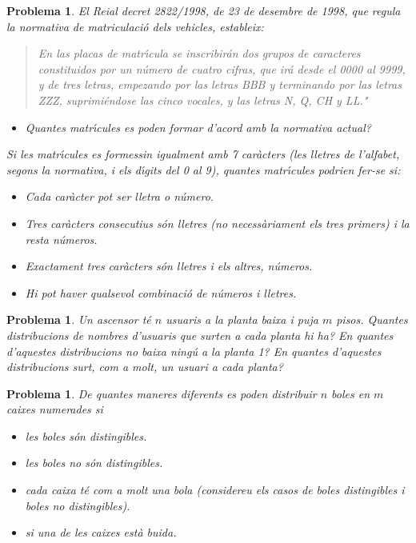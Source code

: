 \documentclass[11pt]{article}
\newcounter{prbcont}
\newtheorem{problema}[prbcont]{Problema}
\begin{document}
\begin{problema}
El Reial decret 2822/1998, de 23 de desembre de 1998, que regula la normativa de matriculaci\'o dels vehicles, estableix:
\begin{quote}
En las placas de matr\'{\i}cula se inscribir\'an dos grupos de caracteres constituidos
por un n\'umero de cuatro cifras, que ir\'a desde el 0000 al 9999, y de tres letras,
empezando por las letras BBB y terminando por las letras ZZZ, suprimi\'endose las cinco vocales, y las letras N, Q, CH y LL."
\end{quote}
\begin{itemize}
\item [(a)] Quantes matr\'{\i}cules es poden formar d'acord amb la normativa actual? 
\end{itemize}
Si les matr\'{\i}cules es formessin igualment amb 7 car\`acters (les lletres de l'alfabet, segons
la normativa, i els d\'{\i}gits del 0 al 9), quantes matr\'{\i}cules podrien fer-se si:
\begin{itemize}
\item [(b)] Cada car\`acter pot ser lletra o n\'umero.
\item [(c)] Tres car\`acters consecutius s\'on lletres (no necess\`ariament els tres primers) i la resta
n\'umeros.
\item [(d)] Exactament tres car\`acters s\'on lletres i els altres, n\'umeros.
\item [(e)] Hi pot haver qualsevol combinaci\'o de n\'umeros i lletres.
\end{itemize}
\end{problema}

\begin{problema}
Un ascensor t\'e $n$ usuaris a la planta baixa i puja $m$ pisos. 
Quantes distribucions de nombres d'usuaris que surten a cada planta hi ha? 
En quantes d'aquestes distribucions no baixa ning\'u a la planta 1? 
En quantes d'aquestes distribucions surt, com a molt, un usuari a cada planta?
\end{problema}

\begin{problema}
De quantes maneres diferents es poden distribuir $n$ boles en $m$ caixes numerades si
\begin{itemize}
\item [(a)] les boles s\'on distingibles.
\item [(b)] les boles no s\'on distingibles.
\item [(c)] cada caixa t\'e com a molt una bola (considereu els casos de boles distingibles i boles
no distingibles).
\item [(d)] si una de les caixes est\`a buida.
\end{itemize}
\end{problema}
\end{document}
